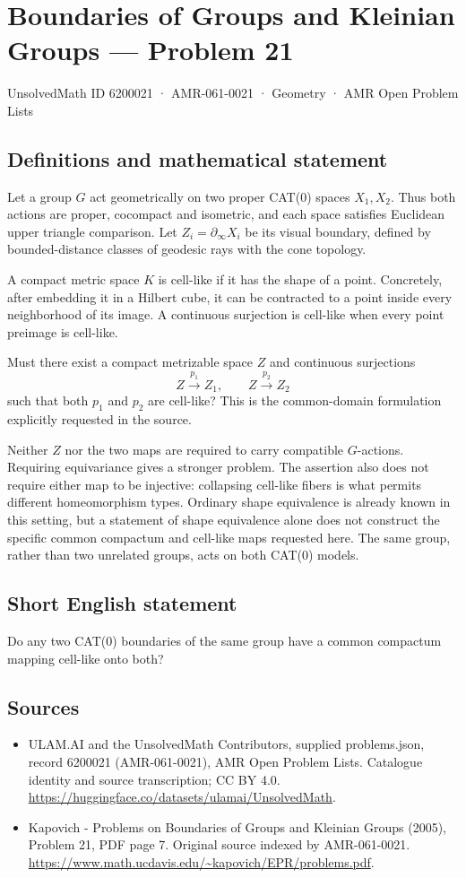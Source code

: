 \documentclass[11pt,a4paper]{article}
\begin{document}
\section*{Boundaries of Groups and Kleinian Groups — Problem 21}\label{6200021}
{\small UnsolvedMath ID 6200021 · AMR-061-0021 · Geometry · AMR Open Problem Lists}
\subsection{Definitions and mathematical statement}
Let a group $G$ act geometrically on two proper CAT(0) spaces $X_1,X_2$. Thus both actions are proper, cocompact and isometric, and each space satisfies Euclidean upper triangle comparison. Let $Z_i=\partial_\infty X_i$ be its visual boundary, defined by bounded-distance classes of geodesic rays with the cone topology.

A compact metric space $K$ is cell-like if it has the shape of a point. Concretely, after embedding it in a Hilbert cube, it can be contracted to a point inside every neighborhood of its image. A continuous surjection is cell-like when every point preimage is cell-like.

Must there exist a compact metrizable space $Z$ and continuous surjections
\[
 Z\xrightarrow{\ p_1\ }Z_1,\qquad Z\xrightarrow{\ p_2\ }Z_2
\]
such that both $p_1$ and $p_2$ are cell-like? This is the common-domain formulation explicitly requested in the source.

Neither $Z$ nor the two maps are required to carry compatible $G$-actions. Requiring equivariance gives a stronger problem. The assertion also does not require either map to be injective: collapsing cell-like fibers is what permits different homeomorphism types. Ordinary shape equivalence is already known in this setting, but a statement of shape equivalence alone does not construct the specific common compactum and cell-like maps requested here. The same group, rather than two unrelated groups, acts on both CAT(0) models.
\subsection{Short English statement}
Do any two CAT(0) boundaries of the same group have a common compactum mapping cell-like onto both?
\subsection{Sources}
\begin{itemize}
\item[S1] ULAM.AI and the UnsolvedMath Contributors, supplied problems.json, record 6200021 (AMR-061-0021), AMR Open Problem Lists. Catalogue identity and source transcription; CC BY 4.0.
\url{https://huggingface.co/datasets/ulamai/UnsolvedMath}.
\item[S2] Kapovich - Problems on Boundaries of Groups and Kleinian Groups (2005), Problem 21, PDF page 7. Original source indexed by AMR-061-0021.
\url{https://www.math.ucdavis.edu/~kapovich/EPR/problems.pdf}.
\end{itemize}
\end{document}
